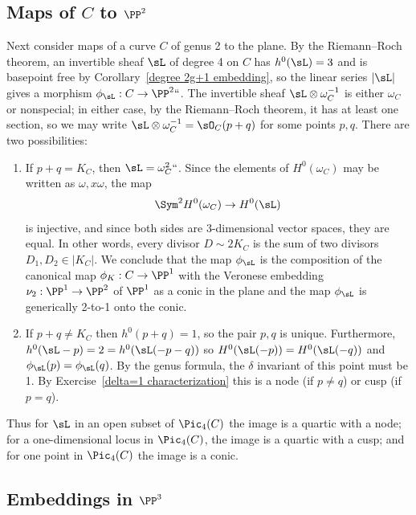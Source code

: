 \subsection*{Maps of $C$ to $\PP^2$}
Next consider maps of a curve $C$ of genus 2 to the plane. By the Riemann--Roch
%
theorem, an invertible sheaf $\sL$ of degree 4 on $C$
has
$h^0(\sL)
= 3$ and is basepoint free by Corollary~\ref{degree 2g+1 embedding}, so
the linear series $|\sL|$  gives a morphism $\phi_\sL : C \to \PP^2` `$. The
invertible sheaf $\sL\otimes \omega_C^{-1}$ is either
$\omega_C$ or nonspecial; in either case, by the Riemann--Roch theorem,
it has at least one section,
so we may write $\sL\otimes \omega_C^{-1} = \sO_C(p+q)$ for some points
$p,q$. There are two possibilities:

\begin{enumerate}
\item If $p+q =  K_C$, then $\sL = \omega_C^2` `$. Since
the elements of $H^0(\omega_C)$ may be written as $\omega, x\omega$,
the map
$$
\Sym^2 H^0(\omega_C) \to H^0(\sL)
$$
 is injective, and since both sides are 3-dimensional vector spaces,
 they are equal. In other words, every divisor $D \sim 2K_C$ is the sum
 of two divisors $D_1, D_2 \in |K_C|$. We conclude that the map $\phi_\sL$
 is the composition of the canonical map $\phi_K : C \to \PP^1$ with the
Veronese embedding
%
 $\nu_2 : \PP^1 \to \PP^2$ of $\PP^1$ as a conic in
 the plane and the map $\phi_\sL$ is generically 2-to-1 onto the conic.

\item
\label{p+q not g12}
If $p+q \neq  K_C$  then $h^0(p+q) = 1$, so the pair $p,q$ is
unique. Furthermore,
 $h^0(\sL-p) = 2 =  h^0(\sL(-p-q))$ so
 $H^0(\sL(-p)) = H^0(\sL(-q))$ and $\phi_\sL(p) = \phi_\sL(q)$.
By the genus formula, the
$\delta$ invariant
%
of this point must be 1. By
Exercise~\ref{delta=1 characterization}
 this is a
node
%
(if $p\neq q$) or
cusp
%
%
(if $p=q$).
\end{enumerate}

Thus  for $\sL$ in an open subset of $\Pic_4(C)$ the image is a quartic
with a node; for a one-dimensional locus in $\Pic_4(C)$, the image is
a quartic with a cusp; and for one point in $\Pic_4(C)$ the image is
a conic.

\subsection*{Embeddings in $\PP^3$}

